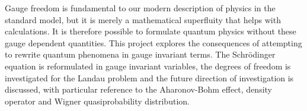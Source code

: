 Gauge freedom is fundamental to our modern description of physics in the
standard model, but it is merely a mathematical superfluity that helps with
calculations. It is therefore possible to formulate quantum physics without
these gauge dependent quantities. This project explores the consequences of
attempting to rewrite quantum phenomena in gauge invariant terms. The
Schr\"odinger equation is reformulated in gauge invariant variables, the degrees
of freedom is investigated for the Landau problem and the future direction of
investigation is discussed, with particular reference to the Aharonov-Bohm
effect, density operator and Wigner quasiprobability distribution.
